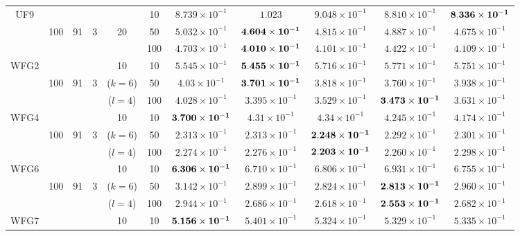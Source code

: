 \documentclass[../main/main]{subfiles}
\begin{document}
\begin{table}[htbp]
\begin{tabular}{c|ccccc|c|c|c|c|c}
\hline
\multirow{3}{*}{UF9} &        &    &&        & 10 &$8.739 \times 10^{-1}$ & $1.023$ & $9.048 \times 10^{-1}$ & $8.810 \times 10^{-1}$ & $\bf{8.336 \times 10^{-1}}$\\
  				   &100 & 91 & 3 & 20 & 50 &$5.032 \times 10^{-1}$ & $\bf{4.604 \times 10^{-1}}$ & $4.815 \times 10^{-1}$ & $4.887 \times 10^{-1}$ & $4.675 \times 10^{-1}$\\
				   &        &     &&   &100 &$4.703 \times 10^{-1}$ & $\bf{4.010 \times 10^{-1}}$ & $4.101 \times 10^{-1}$ & $4.422 \times 10^{-1}$ & $4.109 \times 10^{-1}$\\
\hline
\multirow{3}{*}{WFG2} &      &&  &   10    & 10 &$5.545 \times 10^{-1}$ & $\bf{5.455 \times 10^{-1}}$ & $5.716 \times 10^{-1}$ & $5.771 \times 10^{-1}$ & $5.751 \times 10^{-1}$\\
  				   &100 & 91 & 3 & ($k = 6$) & 50 &$4.03 \times 10^{-1}$ & $\bf{3.701 \times 10^{-1}}$ & $3.818 \times 10^{-1}$ & $3.760 \times 10^{-1}$ & $3.938 \times 10^{-1}$\\
				   &        &   &&  ($l=4$)   &100 &$4.028 \times 10^{-1}$ & $3.395 \times 10^{-1}$ & $3.529 \times 10^{-1}$ & $\bf{3.473 \times 10^{-1}}$ & $3.631 \times 10^{-1}$\\
\hline
\multirow{3}{*}{WFG4} &      &&  &   10    & 10 &$\bf{3.700 \times 10^{-1}}$ & $4.31 \times 10^{-1}$ & $4.34 \times 10^{-1}$ & $4.245 \times 10^{-1}$ & $4.174 \times 10^{-1}$\\
  				   &100 & 91 & 3 & ($k=6$) & 50 &$2.313 \times 10^{-1}$ & $2.313 \times 10^{-1}$ & $\bf{2.248 \times 10^{-1}}$ & $2.292 \times 10^{-1}$ & $2.301 \times 10^{-1}$\\
				   &        &&&  ($l=4$)      &100 &$2.274 \times 10^{-1}$ & $2.276 \times 10^{-1}$ & $\bf{2.203 \times 10^{-1}}$ & $2.260 \times 10^{-1}$ & $2.298 \times 10^{-1}$\\
\hline
\multirow{3}{*}{WFG6} &       && &   10    & 10 & $\bf{6.306 \times 10^{-1}}$ & $6.710 \times 10^{-1}$ & $6.806 \times 10^{-1}$ & $6.931 \times 10^{-1}$ & $6.755 \times 10 ^{-1}$\\
  				   &100 & 91 & 3 & ($k=6$) & 50  &$3.142 \times 10^{-1}$ & $2.899 \times 10^{-1}$ & $2.824 \times 10^{-1}$ & $\bf{2.813 \times 10^{-1}}$ & $2.960 \times 10^{-1}$\\
				   &        &  &&  ($l=4$)    &100  &$2.944 \times 10^{-1}$ & $2.686 \times 10^{-1}$ & $2.618 \times 10^{-1}$ & $\bf{2.553 \times 10^{-1}}$ & $2.682 \times 10^{-1}$\\
\hline
\multirow{3}{*}{WFG7} &       && &  10     & 10 &$\bf{5.156 \times 10^{-1}}$ & $5.401 \times 10^{-1}$ & $5.324 \times 10^{-1}$ & $5.329 \times 10^{-1}$ & $5.335 \times 10^{-1}$\\

\end{tabular}
\end{table}
\end{document}
